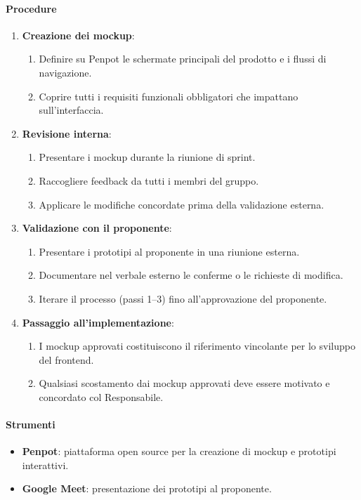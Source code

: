 \documentclass[a4paper, 11pt, oneside]{scrartcl}
\begin{document}
\paragraph{Procedure}
\begin{enumerate}
    \item \textbf{Creazione dei mockup}:
    \begin{enumerate}[label=\alph*.]
        \item Definire su Penpot{\scriptsize{}} le schermate principali del prodotto e i flussi di navigazione.
        \item Coprire tutti i requisiti funzionali obbligatori che impattano sull'interfaccia.
    \end{enumerate}
    \item \textbf{Revisione interna}:
    \begin{enumerate}[label=\alph*.]
        \item Presentare i mockup durante la riunione di sprint.
        \item Raccogliere feedback da tutti i membri del gruppo.
        \item Applicare le modifiche concordate prima della validazione esterna.
    \end{enumerate}
    \item \textbf{Validazione con il proponente}:
    \begin{enumerate}[label=\alph*.]
        \item Presentare i prototipi al proponente in una riunione esterna.
        \item Documentare nel verbale esterno le conferme o le richieste di modifica.
        \item Iterare il processo (passi 1–3) fino all'approvazione del proponente.
    \end{enumerate}
    \item \textbf{Passaggio all'implementazione}:
    \begin{enumerate}[label=\alph*.]
        \item I mockup approvati costituiscono il riferimento vincolante per lo sviluppo del frontend.
        \item Qualsiasi scostamento dai mockup approvati deve essere motivato e concordato col Responsabile.
    \end{enumerate}
\end{enumerate}

\paragraph{Strumenti}
\begin{itemize}
    \item \textbf{Penpot}: piattaforma open source per la creazione di mockup e prototipi interattivi.
    \item \textbf{Google Meet}: presentazione dei prototipi al proponente.
\end{itemize}
\end{document}
